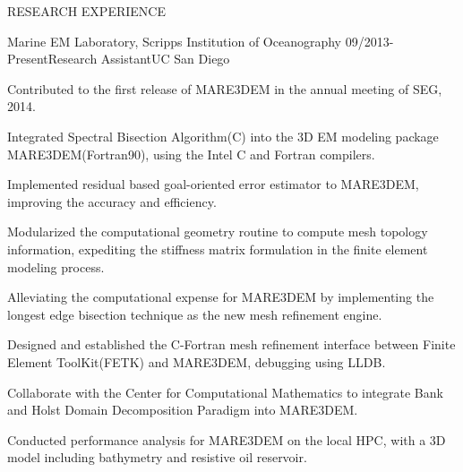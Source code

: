 \documentclass{resume} %
\begin{document}
\begin{rSection}{RESEARCH  EXPERIENCE}

\begin{rSubsection}{Marine EM Laboratory,  Scripps Institution of Oceanography
}{09/2013-Present}{Research Assistant}{UC San Diego}
\item Contributed to the first release of MARE3DEM in the annual meeting of SEG, 2014. 
\item Integrated Spectral Bisection Algorithm(C) into the 3D EM modeling package MARE3DEM(Fortran90), using the Intel C and Fortran compilers. 
\item Implemented residual based goal-oriented error estimator to MARE3DEM, improving the accuracy and efficiency.
\item Modularized the computational geometry routine to compute mesh topology information, expediting the stiffness matrix formulation in the finite element modeling process. 
\item Alleviating the computational expense for MARE3DEM by implementing the longest edge bisection technique as the new mesh refinement engine.
\item Designed and established the C-Fortran mesh refinement interface between Finite Element ToolKit(FETK) and MARE3DEM, debugging using LLDB. 
\item Collaborate with the Center for Computational Mathematics to integrate Bank and Holst Domain Decomposition Paradigm into MARE3DEM. 
\item Conducted performance analysis for MARE3DEM on the local HPC, with a 3D model including bathymetry and resistive oil reservoir.

\end{rSubsection}



\end{rSection}
\end{document}
